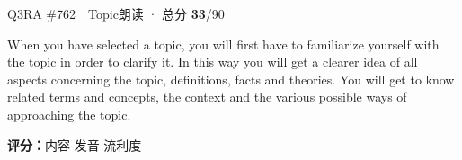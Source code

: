 \begin{qblock}{Q3\quad RA \#762\ \ Topic}{朗读 · 总分 \textcolor{cAccent}{\bfseries 33}/90}
\begin{promptbox}
When you have selected a topic, you will first have to familiarize yourself with the topic in order to clarify it. In this way you will get a clearer idea of all aspects concerning the topic, definitions, facts and theories. You will get to know related terms and concepts, the context and the various possible ways of approaching the topic.
\end{promptbox}
\asrlegend
\begin{asrbox}
      \pse {}                          \pse {}  \pse {}   \pse {} \pse {}             \pse {}          \pse {}
\end{asrbox}
\smallskip
{\small\textbf{评分：}内容  \quad\textperiodcentered\quad 发音  \quad\textperiodcentered\quad 流利度 }
\end{qblock}

